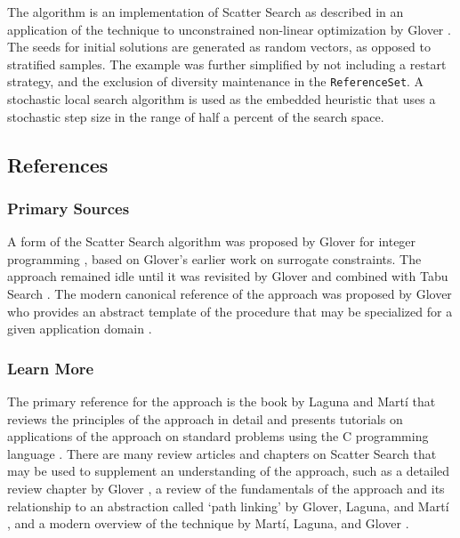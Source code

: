 The algorithm is an implementation of Scatter Search as described in an application of the technique to unconstrained non-linear optimization by Glover \cite{Glover2003b}. The seeds for initial solutions are generated as random vectors, as opposed to stratified samples. The example was further simplified by not including a restart strategy, and the exclusion of diversity maintenance in the \texttt{Reference\-Set}. A stochastic local search algorithm is used as the embedded heuristic that uses a stochastic step size in the range of half a percent of the search space.



\subsection{References}

% 
% 
\subsubsection{Primary Sources}
A form of the Scatter Search algorithm was proposed by Glover for integer programming \cite{Glover1977}, based on Glover's earlier work on surrogate constraints.
The approach remained idle until it was revisited by Glover and combined with Tabu Search \cite{Glover1994a}.
The modern canonical reference of the approach was proposed by Glover who provides an abstract template of the procedure that may be specialized for a given application domain \cite{Glover1998a}. 

% 
% 
\subsubsection{Learn More}
The primary reference for the approach is the book by Laguna and Mart\'i that reviews the principles of the approach in detail and presents tutorials on applications of the approach on standard problems using the C programming language \cite{Laguna2003}.
There are many review articles and chapters on Scatter Search that may be used to supplement an understanding of the approach, such as a detailed review chapter by Glover \cite{Glover1999}, a review of the fundamentals of the approach and its relationship to an abstraction called `path linking' by Glover, Laguna, and Mart\'i \cite{Glover2000}, and a modern overview of the technique by Mart\'i, Laguna, and Glover \cite{Martia2006}.


